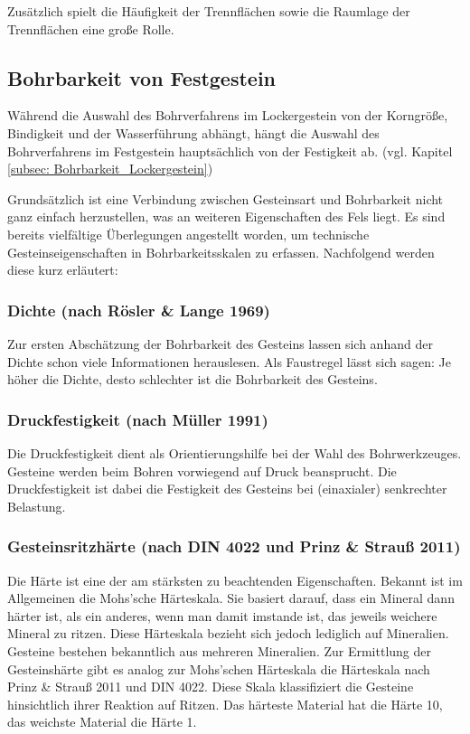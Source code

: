 \documentclass[12pt,a4paper,draft]{scrartcl} %
\begin{document}
Zusätzlich spielt die Häufigkeit der Trennflächen sowie die Raumlage der Trennflächen eine große Rolle.

\subsection{Bohrbarkeit von Festgestein}
Während die Auswahl des Bohrverfahrens im Lockergestein von der Korngröße, Bindigkeit und der Wasserführung abhängt, hängt die Auswahl des Bohrverfahrens im Festgestein hauptsächlich von der Festigkeit ab. (vgl. Kapitel \ref{subsec: Bohrbarkeit_Lockergestein})

Grundsätzlich ist eine Verbindung zwischen Gesteinsart und Bohrbarkeit nicht ganz einfach herzustellen, was an weiteren Eigenschaften des Fels liegt. Es sind bereits vielfältige Überlegungen angestellt worden, um technische Gesteinseigenschaften in Bohrbarkeitsskalen zu erfassen. Nachfolgend werden diese kurz erläutert:

\subsubsection{Dichte (nach Rösler \& Lange 1969)}
Zur ersten Abschätzung der Bohrbarkeit des Gesteins lassen sich anhand der Dichte schon viele Informationen herauslesen. Als Faustregel lässt sich sagen: Je höher die Dichte, desto schlechter ist die Bohrbarkeit des Gesteins.
\subsubsection{Druckfestigkeit (nach Müller 1991)}
Die Druckfestigkeit dient als Orientierungshilfe bei der Wahl des Bohrwerkzeuges. Gesteine werden beim Bohren vorwiegend auf Druck beansprucht. Die Druckfestigkeit ist dabei die Festigkeit des Gesteins bei (einaxialer) senkrechter Belastung.
\subsubsection{Gesteinsritzhärte (nach DIN 4022 und Prinz \& Strauß 2011)}
Die Härte ist eine der am stärksten zu beachtenden Eigenschaften. Bekannt ist im Allgemeinen die Mohs'sche Härteskala. Sie basiert darauf, dass ein Mineral dann härter ist, als ein anderes, wenn man damit imstande ist, das jeweils weichere Mineral zu ritzen. Diese Härteskala bezieht sich jedoch lediglich auf Mineralien. Gesteine bestehen bekanntlich aus mehreren Mineralien. Zur Ermittlung der Gesteinshärte gibt es analog zur Mohs'schen Härteskala die Härteskala nach Prinz \& Strauß 2011 und DIN 4022. Diese Skala klassifiziert die Gesteine hinsichtlich ihrer Reaktion auf Ritzen. Das härteste Material hat die Härte 10, das weichste Material die Härte 1.\\
\end{document}
